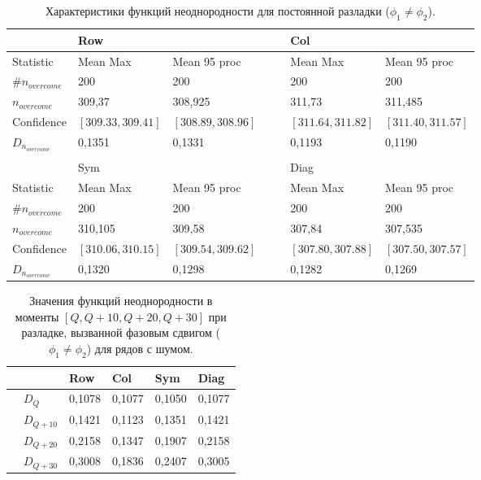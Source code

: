 \documentclass[specialist, substylefile = spbu.rtx,
			   subf, href, 12pt]{disser}
\begin{document}
\newpage
\begin{table}[!hhh]
	\center
	\caption{Характеристики функций неоднородности для постоянной разладки ($\phi_1 \neq \phi_2$).}
	\small
	\begin{tabular}{l|lll|lll}
		  				   & Row		  	  & 			 &&  & 		Col      & 			      \\
		  				   \hline
		 Statistic        & Mean Max 	  & Mean 95 proc && 	& Mean Max     & Mean 95 proc     \\
		 $\#n_{overcome}$ & 200 	  	  & 200 		 &&     & 200 	      & 200 			  \\
		 $n_{overcome}$   & 309,37   	  & 308,925      &&     & 311,73       & 311,485 		  \\
		 Confidence       & $[309.33, 309.41]$& $[308.89, 308.96]$&&     & $[311.64, 311.82]$ & $[311.40, 311.57]$     \\
		$D_{n_{overcome}}$& 0,1351	  &	0,1331		 &&     & 0,1193  &   0,1190         \\
		&&&&&&\\
		  				   & Sym		  	  & 			 && & 	Diag	      & 			      \\
		  				   \hline
		 Statistic        & Mean Max 	  & Mean 95 proc && 	& Mean Max     & Mean 95 proc     \\
		 $\#n_{overcome}$ & 200 	  	  & 200 		 &&     & 200 	      & 200 			  \\
		 $n_{overcome}$   & 310,105   	  & 309,58      &&     & 307,84      & 307,535 		  \\
		 Confidence       & $[310.06, 310.15]$ & $[309.54, 309.62]$ &&     & $[307.80, 307.88]$ & $[307.50, 307.57]$     \\
		$D_{n_{overcome}}$& 0,1320		  &	0,1298		 &&     & 0,1282		 &0,1269          \\
	\end{tabular}
	\label{tab:TemporaryHeterogeneityNoisedShifted}
\end{table}

\begin{table}[!hhh]
	\center
	\caption{Значения функций неоднородности в моменты $[Q, Q+10, Q+20, Q+30]$ при разладке, вызванной фазовым сдвигом ($\phi_1 \neq \phi_2$) для рядов с шумом.}
	\begin{tabular}{ll|llll}
		&              & Row 	  & Col 	& Sym    & Diag  \\
		\hline
		& $D_Q$        & 0,1078	  & 0,1077 	& 0,1050 & 0,1077		\\
		& $D_{Q+10}$   & 0,1421   & 0,1123  & 0,1351 & 0,1421	\\
		& $D_{Q+20}$   & 0,2158   & 0,1347  & 0,1907 & 0,2158	\\
		& $D_{Q+30}$   & 0,3008	  &	0,1836	& 0,2407 & 0,3005	
	\end{tabular}
	\label{tab:TemporaryHeterogeneityNoisedShiftedValues}
\end{table}
\end{document}
